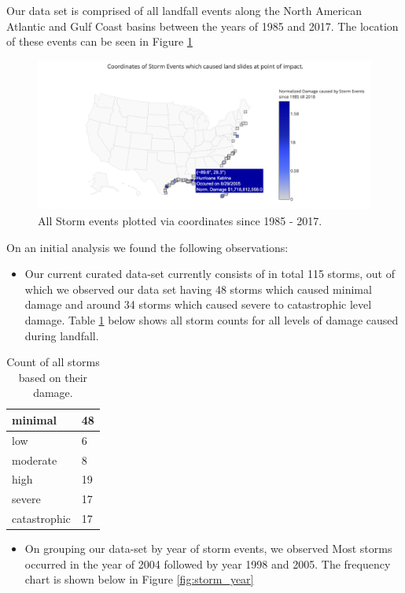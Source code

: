 \documentclass[letterpaper, 10 pt, conference]{ieeeconf}  %
\begin{document}
Our data set is comprised of all landfall events along the North American Atlantic and Gulf Coast basins between the years of 1985 and 2017. The location of these events can be seen in Figure \ref{fig:storm_us}

\begin{figure}[h!]
  \includegraphics[width=\linewidth]{us_map.png}
  \caption{All Storm events plotted via coordinates since 1985 - 2017.}
  \label{fig:storm_us}
\end{figure}

On an initial analysis we found the following observations:
\begin{itemize}
\item Our current curated data-set currently consists of in total 115 storms, out of which we observed our data set having 48 storms which caused minimal damage and around 34 storms which caused severe to catastrophic level damage. Table \ref{table:stormcountsdamage} below shows all storm counts for all levels of damage caused during landfall. 
\end{itemize}

\begin{table}[ht!]
\caption{Count of all storms based on their damage.}
\centering
\begin{tabular}{|l|l|}
\hline
minimal      & 48 \\ \hline
low          & 6  \\ \hline
moderate     & 8  \\ \hline
high         & 19 \\ \hline
severe       & 17 \\ \hline
catastrophic & 17 \\ \hline
\end{tabular}
\label{table:stormcountsdamage}
\end{table}

\begin{itemize}
\item  On grouping our data-set by year of storm events, we observed Most storms occurred in the year of 2004 followed by year 1998 and 2005. The frequency chart is shown below in Figure \ref{fig:storm_year}

\end{itemize}
\end{document}
